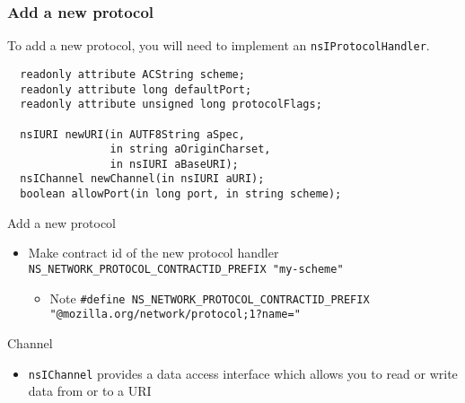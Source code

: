 \documentclass{beamer}
\begin{document}
\begin{frame}[fragile]
  \frametitle{Add a new protocol}
  To add a new protocol, you will need to implement an \texttt{nsIProtocolHandler}.
\begin{verbatim}
  readonly attribute ACString scheme;
  readonly attribute long defaultPort;
  readonly attribute unsigned long protocolFlags;

  nsIURI newURI(in AUTF8String aSpec,
                in string aOriginCharset,
                in nsIURI aBaseURI);
  nsIChannel newChannel(in nsIURI aURI);
  boolean allowPort(in long port, in string scheme);
\end{verbatim}
\end{frame}

\begin{frame}{Add a new protocol}
  \begin{itemize}
  \item Make contract id of the new protocol handler \texttt{NS\_NETWORK\_PROTOCOL\_CONTRACTID\_PREFIX "my-scheme"}
    \begin{itemize}
    \item Note \texttt{\#define NS\_NETWORK\_PROTOCOL\_CONTRACTID\_PREFIX "@mozilla.org/network/protocol;1?name="}
    \end{itemize}
  \end{itemize}
\end{frame}

\begin{frame}{Channel}
  \begin{itemize}
  \item \texttt{nsIChannel} provides a data access interface which allows you to read or write data from or to a URI
  \end{itemize}
\end{frame}




\end{document}
